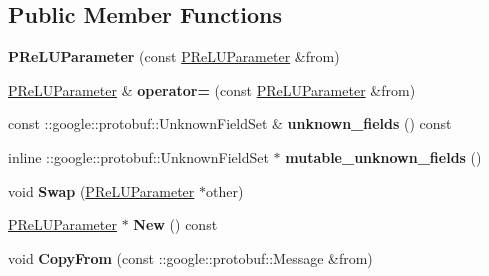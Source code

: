 \subsection*{Public Member Functions}
\begin{DoxyCompactItemize}
\item 
\mbox{\label{classcaffe_1_1_p_re_l_u_parameter_a94f0a1d6dae698c9b84e41fd3c71f075}} 
{\bfseries P\+Re\+L\+U\+Parameter} (const \mbox{\hyperlink{classcaffe_1_1_p_re_l_u_parameter}{P\+Re\+L\+U\+Parameter}} \&from)
\item 
\mbox{\label{classcaffe_1_1_p_re_l_u_parameter_ac7c8a2639cabaa7d07ecce8971c7b609}} 
\mbox{\hyperlink{classcaffe_1_1_p_re_l_u_parameter}{P\+Re\+L\+U\+Parameter}} \& {\bfseries operator=} (const \mbox{\hyperlink{classcaffe_1_1_p_re_l_u_parameter}{P\+Re\+L\+U\+Parameter}} \&from)
\item 
\mbox{\label{classcaffe_1_1_p_re_l_u_parameter_a430a32608158ae45353f4eed42ce9ed2}} 
const \+::google\+::protobuf\+::\+Unknown\+Field\+Set \& {\bfseries unknown\+\_\+fields} () const
\item 
\mbox{\label{classcaffe_1_1_p_re_l_u_parameter_a021825d4075f11734b4758062ef7259b}} 
inline \+::google\+::protobuf\+::\+Unknown\+Field\+Set $\ast$ {\bfseries mutable\+\_\+unknown\+\_\+fields} ()
\item 
\mbox{\label{classcaffe_1_1_p_re_l_u_parameter_a6882c8d80415be68220e48bb3797d11b}} 
void {\bfseries Swap} (\mbox{\hyperlink{classcaffe_1_1_p_re_l_u_parameter}{P\+Re\+L\+U\+Parameter}} $\ast$other)
\item 
\mbox{\label{classcaffe_1_1_p_re_l_u_parameter_a9bbc3bc37eed7350a6783cb1d742ec88}} 
\mbox{\hyperlink{classcaffe_1_1_p_re_l_u_parameter}{P\+Re\+L\+U\+Parameter}} $\ast$ {\bfseries New} () const
\item 
\mbox{\label{classcaffe_1_1_p_re_l_u_parameter_a3198ca4c9131fc3e86fed2a68cbbfd6e}} 
void {\bfseries Copy\+From} (const \+::google\+::protobuf\+::\+Message \&from)
\item 

\end{DoxyCompactItemize}
